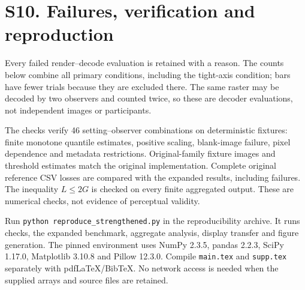 \documentclass[10pt]{article}
\begin{document}
\begin{center}\end{center}



\section*{S10. Failures, verification and reproduction}
Every failed render--decode evaluation is retained with a reason. The counts below combine all primary conditions, including the tight-axis condition; bars have fewer trials because they are excluded there. The same raster may be decoded by two observers and counted twice, so these are decoder evaluations, not independent images or participants.

\small\normalsize

The checks verify 46 setting--observer combinations on deterministic fixtures: finite monotone quantile estimates, positive scaling, blank-image failure, pixel dependence and metadata restrictions. Original-family fixture images and threshold estimates match the original implementation. Complete original reference CSV losses are compared with the expanded results, including failures. The inequality $L\leq2G$ is checked on every finite aggregated output. These are numerical checks, not evidence of perceptual validity.

Run \texttt{python reproduce\_strengthened.py} in the reproducibility archive. It runs checks, the expanded benchmark, aggregate analysis, display transfer and figure generation. The pinned environment uses NumPy 2.3.5, pandas 2.2.3, SciPy 1.17.0, Matplotlib 3.10.8 and Pillow 12.3.0. Compile \texttt{main.tex} and \texttt{supp.tex} separately with pdfLaTeX/BibTeX. No network access is needed when the supplied arrays and source files are retained.
\end{document}

